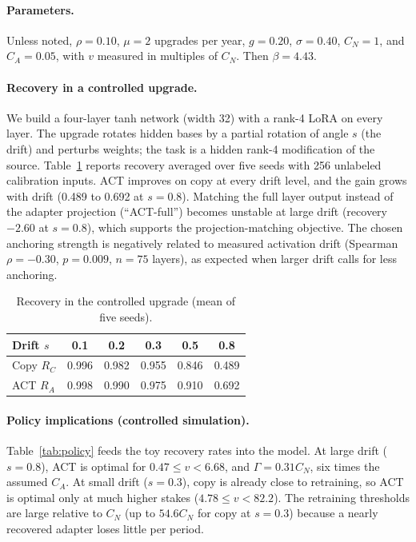 \documentclass[ijoc,nonblindrev]{informs4}
\begin{document}
\paragraph{Parameters.} Unless noted, $\rho=0.10$, $\mu=2$ upgrades per year, $g=0.20$, $\sigma=0.40$, $C_N=1$, and
$C_A=0.05$, with $v$ measured in multiples of $C_N$. Then $\beta=4.43$.

\paragraph{Recovery in a controlled upgrade.} We build a four-layer tanh network (width 32) with a rank-4 LoRA on
every layer. The upgrade rotates hidden bases by a partial rotation of angle $s$ (the drift) and perturbs weights; the
task is a hidden rank-4 modification of the source. Table~\ref{tab:toy} reports recovery averaged over five seeds
with 256 unlabeled calibration inputs. ACT improves on copy at every drift level, and the gain grows with drift
(0.489 to 0.692 at $s=0.8$). Matching the full layer output instead of the adapter projection (``ACT-full'') becomes
unstable at large drift (recovery $-2.60$ at $s=0.8$), which supports the projection-matching objective. The chosen
anchoring strength is negatively related to measured activation drift (Spearman $\rho=-0.30$, $p=0.009$,
$n=75$ layers), as expected when larger drift calls for less anchoring.

\begin{table}[t]
\centering
\caption{Recovery in the controlled upgrade (mean of five seeds).}\label{tab:toy}
\begin{tabular}{lccccc}
\toprule
Drift $s$ & 0.1 & 0.2 & 0.3 & 0.5 & 0.8\\
\midrule
Copy $R_C$ & 0.996 & 0.982 & 0.955 & 0.846 & 0.489\\
ACT $R_A$ & 0.998 & 0.990 & 0.975 & 0.910 & 0.692\\
\bottomrule
\end{tabular}
\end{table}

\paragraph{Policy implications (controlled simulation).} Table~\ref{tab:policy} feeds the toy recovery rates into the model. At large drift
($s=0.8$), ACT is optimal for $0.47\le v<6.68$, and $\Gamma=0.31C_N$, six times the assumed $C_A$. At small drift
($s=0.3$), copy is already close to retraining, so ACT is optimal only at much higher stakes ($4.78\le v<82.2$).
The retraining thresholds are large relative to $C_N$ (up to $54.6C_N$ for copy at $s=0.3$) because a nearly
recovered adapter loses little per period.
\end{document}
